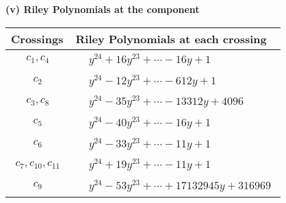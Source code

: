 \documentclass[1p]{elsarticle_modified}
\theoremstyle{definition}
\begin{document}
\newpage\renewcommand{\arraystretch}{1}
\flushleft \textbf{(v) Riley Polynomials at the component}\newline \\
\begin{tabular}{m{50pt}|m{274pt}}
Crossings & \hspace{64pt}Riley Polynomials at each crossing \\
\hline $$\begin{aligned}c_{1},c_{4}\end{aligned}$$&$\begin{aligned}
&y^{24}+16 y^{23}+\cdots-16 y+1
\end{aligned}$\\
\hline $$\begin{aligned}c_{2}\end{aligned}$$&$\begin{aligned}
&y^{24}-12 y^{23}+\cdots-612 y+1
\end{aligned}$\\
\hline $$\begin{aligned}c_{3},c_{8}\end{aligned}$$&$\begin{aligned}
&y^{24}-35 y^{23}+\cdots-13312 y+4096
\end{aligned}$\\
\hline $$\begin{aligned}c_{5}\end{aligned}$$&$\begin{aligned}
&y^{24}-40 y^{23}+\cdots-16 y+1
\end{aligned}$\\
\hline $$\begin{aligned}c_{6}\end{aligned}$$&$\begin{aligned}
&y^{24}-33 y^{23}+\cdots-11 y+1
\end{aligned}$\\
\hline $$\begin{aligned}c_{7},c_{10},c_{11}\end{aligned}$$&$\begin{aligned}
&y^{24}+19 y^{23}+\cdots-11 y+1
\end{aligned}$\\
\hline $$\begin{aligned}c_{9}\end{aligned}$$&$\begin{aligned}
&y^{24}-53 y^{23}+\cdots+17132945 y+316969
\end{aligned}$\\
\hline
\end{tabular}\\~\\
\end{document}
